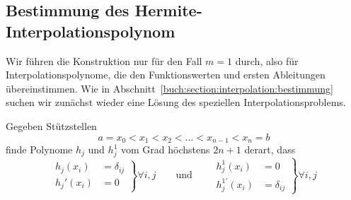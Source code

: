 %
%
\subsection{Bestimmung des Hermite-Interpolationspolynom
\label{buch:subsection:hermite:bestimmung}}
Wir führen die Konstruktion nur für den Fall $m=1$ durch, also für 
Interpolationspolynome, die den Funktionswerten und ersten Ableitungen
übereinstimmen.
Wie in Abschnitt~\ref{buch:section:interpolation:bestimmung} suchen
wir zunächst wieder eine Lösung des speziellen Interpolationsproblems.

\begin{aufgabe}
Gegeben Stützstellen
\[
a=x_0<x_1<x_2<\dots < x_{n-1}<x_n=b
\]
finde Polynome $h_j$ und $h_j^1$ vom Grad höchstens $2n+1$ derart, dass
\[
\left.
\begin{aligned}
h_j(x_i)&=\delta_{ij}\\
h_j'(x_i)&=0
\end{aligned}\right\}\forall i,j
\qquad\text{und}\qquad
\left.
\begin{aligned}
h_j^1(x_i)&=0\\
h_j^{1\prime}(x_i)&=\delta_{ij}
\end{aligned}\right\}\forall i,j
\]
\end{aufgabe}

